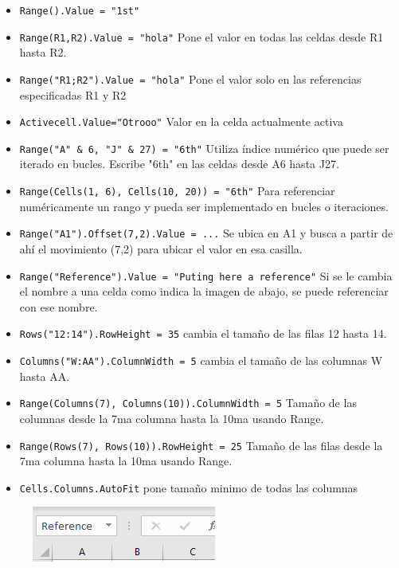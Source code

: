 \begin{itemize}
    \item \texttt{Range().Value = "1st"} 
    \item \texttt{Range(R1,R2).Value = "hola"} Pone el valor en todas las celdas desde R1 hasta R2. 
    \item \texttt{Range("R1;R2").Value = "hola"} Pone el valor solo en las referencias especificadas R1 y R2
    \item \texttt{Activecell.Value="Otrooo"} Valor en la celda actualmente activa
    \item \texttt{Range("A" \& 6, "J" \& 27) = "6th"} Utiliza índice numérico que puede ser iterado en bucles. Escribe "6th" en las celdas desde A6 hasta J27.
    \item \texttt{Range(Cells(1, 6), Cells(10, 20)) = "6th"} Para referenciar numéricamente un rango y pueda ser implementado en bucles o iteraciones.
    \item \texttt{Range("A1").Offset(7,2).Value = ...} Se ubica en A1 y busca a partir de ahí el movimiento (7,2) para ubicar el valor en esa casilla. 
    \item \texttt{Range("Reference").Value = "Puting here a reference"} Si se le cambia el nombre a una celda como indica la imagen de abajo, se puede referenciar con ese nombre.
    \item \texttt{Rows("12:14").RowHeight = 35} cambia el tamaño de las filas 12 hasta 14.
    \item \texttt{Columns("W:AA").ColumnWidth = 5} cambia el tamaño de las columnas W hasta AA.
    \item \texttt{Range(Columns(7), Columns(10)).ColumnWidth = 5} Tamaño de las columnas desde la 7ma  columna hasta la 10ma usando Range.
    \item \texttt{Range(Rows(7), Rows(10)).RowHeight = 25} Tamaño de las filas desde la 7ma  columna hasta la 10ma usando Range.
    \item \texttt{Cells.Columns.AutoFit} pone tamaño minimo de todas las columnas
\end{itemize}


\begin{figure}[H]
    \centering
    \includegraphics{ExcelMacro/reference.png}
\end{figure}


